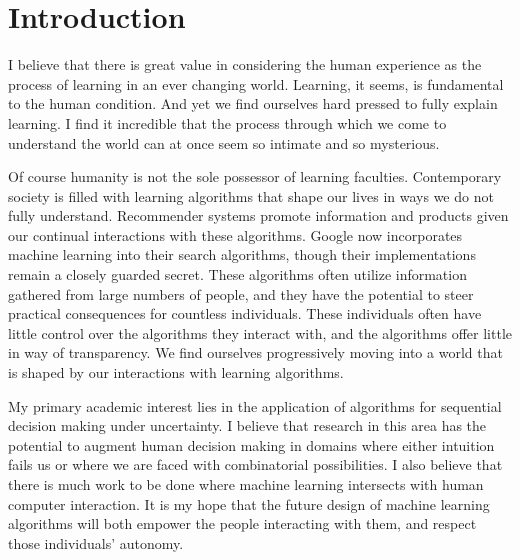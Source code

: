 \section*{Introduction}
I believe that there is great value in considering the human experience as the process of learning in an ever changing world. Learning, it seems, is fundamental to the human condition. And yet we find ourselves hard pressed to fully explain learning. I find it incredible that the process through which we come to understand the world can at once seem so intimate and so mysterious. 

Of course humanity is not the sole possessor of learning faculties. Contemporary society is filled with learning algorithms that shape our lives in ways we do not fully understand. Recommender systems promote information and products given our continual interactions with these algorithms. Google now incorporates machine learning into their search algorithms, though their implementations remain a closely guarded secret. These algorithms often utilize information gathered from large numbers of people, and they have the potential to steer practical consequences for countless individuals. These individuals often have little control over the algorithms they interact with, and the algorithms offer little in way of transparency. We find ourselves progressively moving into a world that is shaped by our interactions with learning algorithms.

My primary academic interest lies in the application of algorithms for sequential decision making under uncertainty. I believe that research in this area has the potential to augment human decision making in domains where either intuition fails us or where we are faced with combinatorial possibilities. I also believe that there is much work to be done where machine learning intersects with human computer interaction. It is my hope that the future design of machine learning algorithms will both empower the people interacting with them, and respect those individuals' autonomy. 